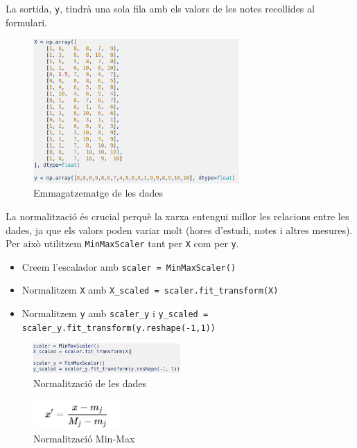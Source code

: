 La sortida, \texttt{y}, tindrà una sola fila amb els valors de les notes recollides al formulari.

\begin{figure}[h!]
\centering
\includegraphics[width=0.7\textwidth]{./figures/23.png}
\caption{Emmagatzematge de les dades}
\end{figure}

La normalització és crucial perquè la xarxa entengui millor les relacions entre les dades, ja que els valors poden variar molt (hores d’estudi, notes i altres mesures). Per això utilitzem \texttt{MinMaxScaler} tant per \texttt{X} com per \texttt{y}.

\begin{itemize}
\item Creem l’escalador amb \texttt{scaler = MinMaxScaler()}
\item Normalitzem \texttt{X} amb \texttt{X\_scaled = scaler.fit\_transform(X)}
\item Normalitzem \texttt{y} amb \texttt{scaler\_y} i \texttt{y\_scaled = scaler\_y.fit\_transform(y.reshape(-1,1))}
\end{itemize}

\begin{figure}[H]
\centering
\includegraphics[width=0.5\textwidth]{./figures/24.png}
\caption{Normalització de les dades}
\end{figure}

\begin{figure}[H]
\centering
\includegraphics[width=0.3\textwidth]{./figures/25.png}
\caption{Normalització Min-Max\cite{Min-Max}}
\end{figure}

